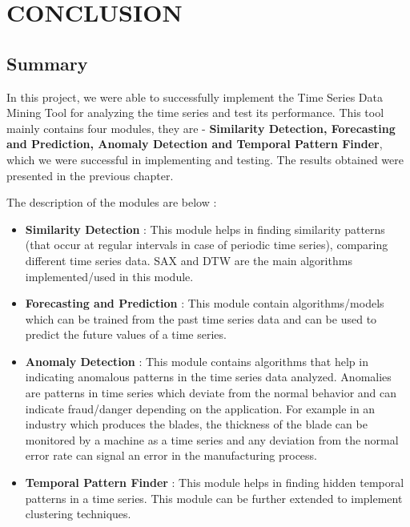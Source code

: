 \documentclass[12pt]{report}
\begin{document}
\pagestyle{fancy}
\chead{}
\rfoot{\small{\thepage}}
\renewcommand{\headrulewidth}{0.4pt}
\renewcommand{\footrulewidth}{0.4pt}
\chapter{CONCLUSION}
\section{Summary}
In this project, we were able to successfully implement the Time Series Data Mining Tool for analyzing the time series and test its performance. This tool mainly contains four modules, they are - \textbf{Similarity Detection, Forecasting and Prediction, Anomaly Detection and Temporal Pattern Finder}, which we were successful in implementing and testing. The results obtained were presented in the previous chapter.

The description of the modules are below :
\begin{itemize}
\item \textbf{Similarity Detection} : This module helps in finding similarity patterns (that occur at regular intervals in case of periodic time series), comparing different time series data. SAX and DTW are the main algorithms implemented/used in this module.
\item \textbf{Forecasting and Prediction} : This module contain algorithms/models which can be trained from the past time series data and can be used to predict the future values of a time series. 
\item \textbf{Anomaly Detection} : This module contains algorithms that help in indicating anomalous patterns in the time series data analyzed. Anomalies are patterns in time series which deviate from the normal behavior and can indicate fraud/danger depending on the application. For example in an industry which produces the blades, the thickness of the blade can be monitored by a machine as a time series and any deviation from the normal error rate can signal an error in the manufacturing process.
\item \textbf{Temporal Pattern Finder } : This module helps in finding hidden temporal patterns in a time series. This module can be further extended to implement clustering techniques.
\end{itemize}
\end{document}
